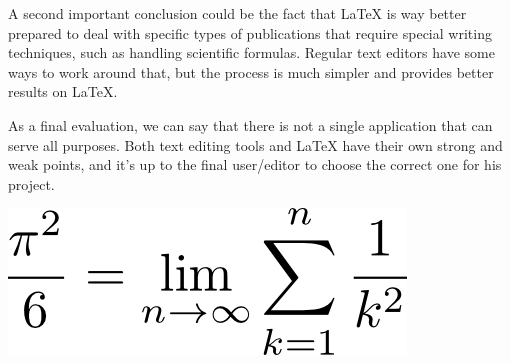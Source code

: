 A second important conclusion could be the fact that LaTeX is way better prepared to deal with specific types of publications that require special writing techniques, such as handling scientific formulas. Regular text editors have some ways to work around that, but the process is much simpler and provides better results on LaTeX.

As a final evaluation, we can say that there is not a single application that can serve all purposes. Both text editing tools and LaTeX have their own strong and weak points, and it's up to the final user/editor to choose the correct one for his project.

\includegraphics[scale=0.5]{LatexFormulaEffect}
